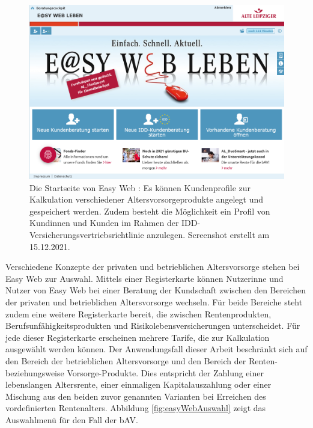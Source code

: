 \begin{figure}[!htb]
\centering
\includegraphics[width=0.8\columnwidth]{images/Easy_Web_Leben_allgemein.png}
\caption{Die Startseite von Easy Web \cite{easy_web}: Es können Kundenprofile zur Kalkulation verschiedener Altersvorsorgeprodukte angelegt und gespeichert werden. Zudem besteht die Möglichkeit ein Profil von Kundinnen und Kunden im Rahmen der IDD-Versicherungsvertriebsrichtlinie anzulegen. Screenshot erstellt am 15.12.2021.}
\label{fig:easyWeballg}
\end{figure}

Verschiedene Konzepte der privaten und betrieblichen Altersvorsorge stehen bei Easy Web zur Auswahl. Mittels einer Registerkarte können Nutzerinne und Nutzer von Easy Web bei einer Beratung der Kundschaft zwischen den Bereichen der privaten und betrieblichen Altersvorsorge wechseln. Für beide Bereiche steht zudem eine weitere Registerkarte bereit, die zwischen Rentenprodukten, Berufsunfähigkeitsprodukten und Risikolebensversicherungen unterscheidet. Für jede dieser Registerkarte erscheinen mehrere Tarife, die zur Kalkulation ausgewählt werden können. Der Anwendungsfall dieser Arbeit beschränkt sich auf den Bereich der betrieblichen Altersvorsorge und den Bereich der Renten- beziehungsweise \glqq Vorsorge\grqq{}-Produkte. Dies entspricht der Zahlung einer lebenslangen Altersrente, einer einmaligen Kapitalauszahlung oder einer Mischung aus den beiden zuvor genannten Varianten bei Erreichen des vordefinierten Rentenalters. Abbildung \ref{fig:easyWebAuswahl} zeigt das Auswahlmenü für den Fall der bAV.


